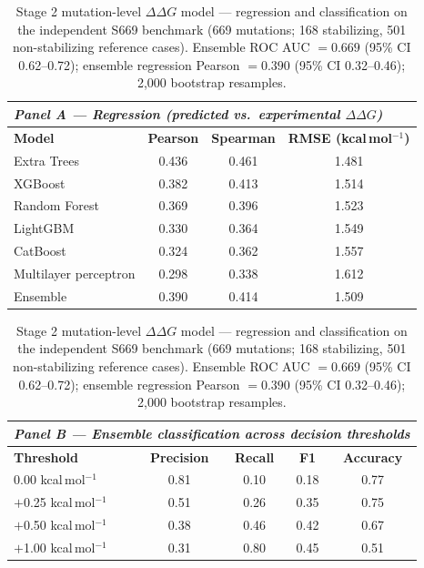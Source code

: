 \documentclass[11pt]{article}
\newcommand{\ddg}{\ensuremath{\Delta\Delta G}}
\begin{document}
\begin{table}[htbp]
\centering
\caption{Stage 2 mutation-level \ddg{} model --- regression and classification on the independent
S669 benchmark (669 mutations; 168 stabilizing, 501 non-stabilizing reference cases). Ensemble
ROC AUC $=0.669$ (95\% CI 0.62--0.72); ensemble regression Pearson $=0.390$ (95\% CI 0.32--0.46);
2{,}000 bootstrap resamples.}
\label{tab:stage2}
\small
\begin{tabular}{lccc}
\toprule
\multicolumn{4}{l}{\textit{Panel A --- Regression (predicted vs.\ experimental \ddg)}}\\
\midrule
\textbf{Model} & \textbf{Pearson} & \textbf{Spearman} & \textbf{RMSE (kcal\,mol$^{-1}$)}\\
\midrule
Extra Trees           & 0.436 & 0.461 & 1.481\\
XGBoost               & 0.382 & 0.413 & 1.514\\
Random Forest         & 0.369 & 0.396 & 1.523\\
LightGBM              & 0.330 & 0.364 & 1.549\\
CatBoost              & 0.324 & 0.362 & 1.557\\
Multilayer perceptron & 0.298 & 0.338 & 1.612\\
Ensemble              & 0.390 & 0.414 & 1.509\\
\bottomrule
\end{tabular}

\vspace{6pt}
\begin{tabular}{lcccc}
\toprule
\multicolumn{5}{l}{\textit{Panel B --- Ensemble classification across decision thresholds}}\\
\midrule
\textbf{Threshold} & \textbf{Precision} & \textbf{Recall} & \textbf{F1} & \textbf{Accuracy}\\
\midrule
0.00 kcal\,mol$^{-1}$  & 0.81 & 0.10 & 0.18 & 0.77\\
$+$0.25 kcal\,mol$^{-1}$ & 0.51 & 0.26 & 0.35 & 0.75\\
$+$0.50 kcal\,mol$^{-1}$ & 0.38 & 0.46 & 0.42 & 0.67\\
$+$1.00 kcal\,mol$^{-1}$ & 0.31 & 0.80 & 0.45 & 0.51\\
\bottomrule
\end{tabular}


\end{table}
\end{document}
